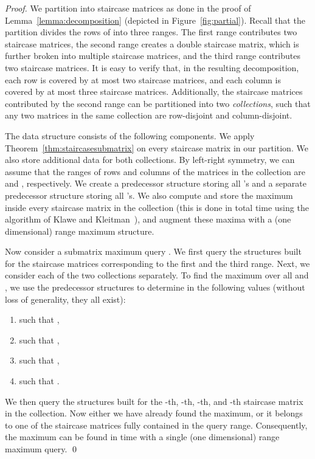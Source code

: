 \documentclass{llncs}
\begin{document}
\begin{proof}
We partition  into staircase matrices as done in the proof of Lemma~\ref{lemma:decomposition} (depicted in
Figure~\ref{fig:partial}). 
Recall that the partition divides the rows of  into three ranges. The first range
contributes two staircase matrices, the second range creates a double staircase
matrix, which is further broken into multiple staircase matrices, and the third range
contributes two staircase matrices. 
It is easy to verify that, in the resulting decomposition, each row
is covered by at most two staircase matrices, and each column is covered
by at most three staircase matrices.
Additionally, the staircase matrices contributed by the second range
can be partitioned into two \emph{collections},
such that any two matrices in the same collection are row-disjoint and
column-disjoint.




The data structure consists of the following components. We apply Theorem~\ref{thm:staircasesubmatrix} on every staircase  matrix in our partition. We also store additional
data for both collections. By left-right symmetry, we can assume that
the ranges of rows and columns of the matrices in the collection
are  and , respectively.
We create a predecessor structure storing all 's and a separate predecessor structure
storing all 's. We also compute and store the maximum inside every staircase 
matrix in the collection (this is done in total  time using the algorithm of Klawe and Kleitman~\cite{KK89}), and augment these maxima with a (one dimensional) range maximum structure.

Now consider a submatrix maximum query  . We first query the  structures built for
the staircase matrices corresponding to the first and the third range.
Next, we consider each of the two collections separately. To find the maximum  over
all  and , we use the predecessor structures
to determine in  the following values (without loss of generality,
they all exist):
\begin{enumerate}
\item  such that ,
\item  such that ,
\item  such that ,
\item  such that .
\end{enumerate}
We then query the structures built for the -th, -th,
-th, and -th staircase matrix in the collection.
Now either we have already found the maximum, or it belongs
to one of the staircase matrices fully contained in the query range. Consequently, the maximum
can be found in  time with a single (one dimensional) range maximum query.
\qed \end{proof}
\end{document}
